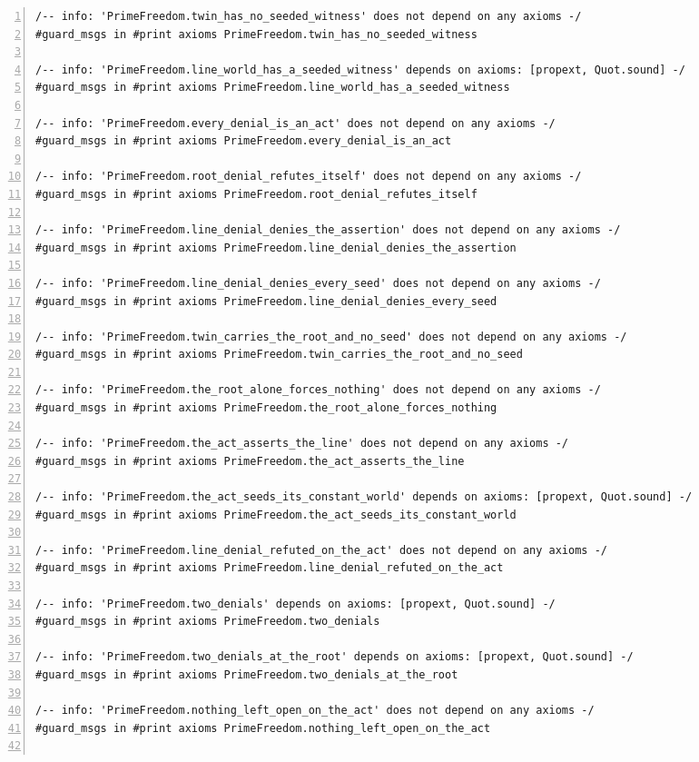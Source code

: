 \documentclass[10pt]{article}
\newcommand{\leansize}{\fontsize{5.5pt}{6.75pt}\selectfont}
\begin{document}
\begin{multicols}{2}
\begin{Verbatim}[numbers=left,firstnumber=1,numbersep=3pt,xleftmargin=2.6em,breaklines=true,breakanywhere=true,breakautoindent=false,breakindent=1.4em,breaksymbolleft={},breakanywheresymbolpre={},fontsize=\leansize]
/-- info: 'PrimeFreedom.twin_has_no_seeded_witness' does not depend on any axioms -/
#guard_msgs in #print axioms PrimeFreedom.twin_has_no_seeded_witness

/-- info: 'PrimeFreedom.line_world_has_a_seeded_witness' depends on axioms: [propext, Quot.sound] -/
#guard_msgs in #print axioms PrimeFreedom.line_world_has_a_seeded_witness

/-- info: 'PrimeFreedom.every_denial_is_an_act' does not depend on any axioms -/
#guard_msgs in #print axioms PrimeFreedom.every_denial_is_an_act

/-- info: 'PrimeFreedom.root_denial_refutes_itself' does not depend on any axioms -/
#guard_msgs in #print axioms PrimeFreedom.root_denial_refutes_itself

/-- info: 'PrimeFreedom.line_denial_denies_the_assertion' does not depend on any axioms -/
#guard_msgs in #print axioms PrimeFreedom.line_denial_denies_the_assertion

/-- info: 'PrimeFreedom.line_denial_denies_every_seed' does not depend on any axioms -/
#guard_msgs in #print axioms PrimeFreedom.line_denial_denies_every_seed

/-- info: 'PrimeFreedom.twin_carries_the_root_and_no_seed' does not depend on any axioms -/
#guard_msgs in #print axioms PrimeFreedom.twin_carries_the_root_and_no_seed

/-- info: 'PrimeFreedom.the_root_alone_forces_nothing' does not depend on any axioms -/
#guard_msgs in #print axioms PrimeFreedom.the_root_alone_forces_nothing

/-- info: 'PrimeFreedom.the_act_asserts_the_line' does not depend on any axioms -/
#guard_msgs in #print axioms PrimeFreedom.the_act_asserts_the_line

/-- info: 'PrimeFreedom.the_act_seeds_its_constant_world' depends on axioms: [propext, Quot.sound] -/
#guard_msgs in #print axioms PrimeFreedom.the_act_seeds_its_constant_world

/-- info: 'PrimeFreedom.line_denial_refuted_on_the_act' does not depend on any axioms -/
#guard_msgs in #print axioms PrimeFreedom.line_denial_refuted_on_the_act

/-- info: 'PrimeFreedom.two_denials' depends on axioms: [propext, Quot.sound] -/
#guard_msgs in #print axioms PrimeFreedom.two_denials

/-- info: 'PrimeFreedom.two_denials_at_the_root' depends on axioms: [propext, Quot.sound] -/
#guard_msgs in #print axioms PrimeFreedom.two_denials_at_the_root

/-- info: 'PrimeFreedom.nothing_left_open_on_the_act' does not depend on any axioms -/
#guard_msgs in #print axioms PrimeFreedom.nothing_left_open_on_the_act


\end{Verbatim}
\end{multicols}
\end{document}
